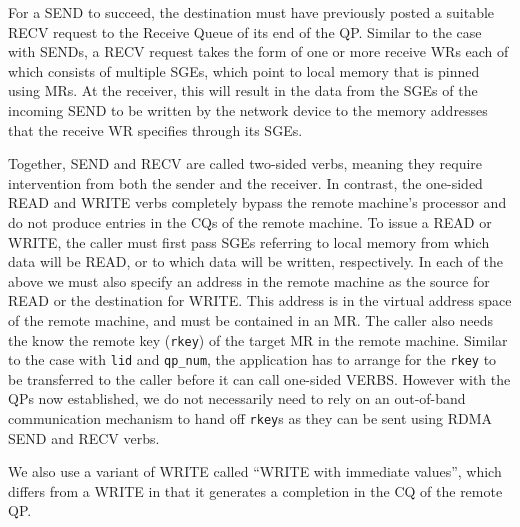 For a SEND to succeed, the destination must have previously posted a suitable
RECV request to the Receive Queue of its end of the QP. Similar to the case with SENDs,
a RECV request takes the form of one or more receive WRs each of which
consists of multiple SGEs, which point to local memory that is pinned using
MRs. At the receiver, this will result in the data from the SGEs of the incoming
SEND to be written by the network device to the memory addresses that the
receive WR specifies through its SGEs.

Together, SEND and RECV are called two-sided verbs, meaning they require
intervention from both the sender and the receiver. In contrast, the one-sided
READ and WRITE verbs completely bypass the remote machine's processor and do not
produce entries in the CQs of the remote machine. To
issue a READ or WRITE, the caller must first pass SGEs referring to local memory
from which data will be READ, or to which data will be written, respectively.
In each of the above we must also specify an address in the remote machine
as the source for READ or the destination for WRITE. This address is in
the virtual address space of the remote machine, and must be contained in an
MR. The caller also needs the know the remote key (\texttt{rkey}) of the target
MR in the remote machine. Similar to the case with \texttt{lid} and
\texttt{qp\_num}, the application has to arrange for the \texttt{rkey} to be
transferred to the caller before it can call one-sided VERBS. However with the
QPs now established, we do not necessarily need to rely on an out-of-band
communication mechanism to hand off \texttt{rkey}s as they can be sent using
RDMA SEND and RECV verbs.

We also use a variant of WRITE called ``WRITE with immediate values'', which
differs from a WRITE in that it generates a completion in the CQ of the
remote QP.

